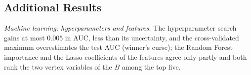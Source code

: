 \subsection{Additional Results}
\emph{Machine learning: hyperparameters and features.} The hyperparameter search gains at most $0.005$ in AUC, less than its uncertainty, and the cross-validated maximum overestimates the test AUC (winner's curse); the Random Forest importance and the Lasso coefficients of the features agree only partly and both rank the two vertex variables of the $B$ among the top five.
